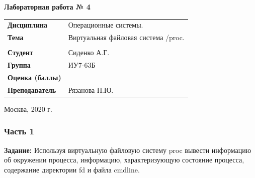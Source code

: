\documentclass[a4paper,14pt]{extreport} %
\begin{document}
\begin{titlepage}
    \vspace{2cm}

    \begin{center}
        \textbf{Лабораторная работа № 4} \\
        \vspace{0.5cm}
    \end{center}

    \vspace{4cm}

    \begin{flushleft}
        \begin{tabular}{ll}
            \textbf{Дисциплина} & Операционные системы.  \\
            \textbf{Тема} & Виртуальная файловая система /proc.  \\
            \\
            \textbf{Студент} & Сиденко А.Г. \\
            \textbf{Группа} & ИУ7-63Б \\
            \textbf{Оценка (баллы)} & \\
            \textbf{Преподаватель} & Рязанова Н.Ю.   \\
        \end{tabular}
    \end{flushleft}

    \vspace{4cm}

   \begin{center}
        Москва, 2020 г.
    \end{center}

\end{titlepage}

\subsubsection{Часть 1}

\hfill

\textbf{Задание: } Используя виртуальную файловую систему proc вывести информацию об окружении процесса, информацию, характеризующую состояние процесса, содержание директории fd и файла cmdline.
\end{document}
